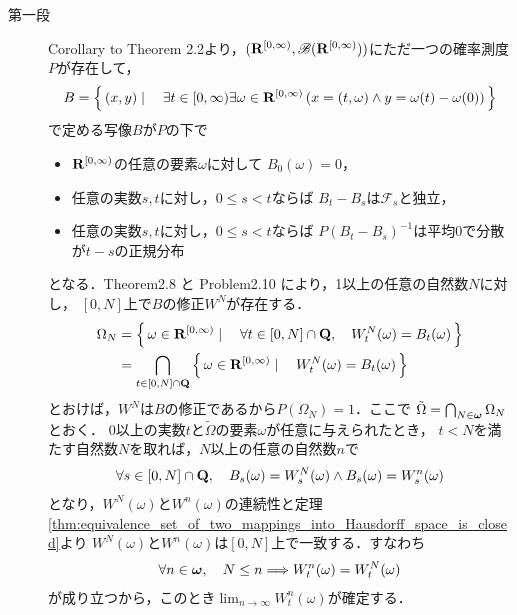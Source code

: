 	\begin{prf}\mbox{}
		\begin{description}
			\item[第一段]
				Corollary to Theorem 2.2より，$(\mathbf{R}^{[0,\infty)},\mathscr{B}(\mathbf{R}^{[0,\infty)}))$にただ一つの確率測度$P$が存在して，
				\begin{align}
					B = \left\{\, (x,y) \mid \quad \exists t \in [0,\infty) \exists \omega \in \mathbf{R}^{[0,\infty)}
					\left( x=(t,\omega) \wedge y=\omega(t)-\omega(0) \right)\, \right\}
				\end{align}
				で定める写像$B$が$P$の下で
				\begin{itemize}
					\item $\mathbf{R}^{[0,\infty)}$の任意の要素$\omega$に対して
						$B_0(\omega) = 0$，
					\item 任意の実数$s,t$に対し，$0 \leq s < t$ならば
						$B_t - B_s$は$\mathscr{F}_s$と独立，
					\item 任意の実数$s,t$に対し，$0 \leq s < t$ならば
						$P(B_t - B_s)^{-1}$は平均0で分散が$t-s$の正規分布
				\end{itemize}
				となる．Theorem2.8 と Problem2.10 により，1以上の任意の自然数$N$に対し，
				$[0,N]$上で$B$の修正$W^N$が存在する．
				\begin{align}
					\Omega_N &= \left\{\, \omega \in \mathbf{R}^{[0,\infty)} \mid \quad \forall t \in [0,N] \cap \mathbf{Q},
					\quad W_t^N(\omega) = B_t(\omega)\, \right\} \\
					&= \bigcap_{t \in [0,N] \cap \mathbf{Q}} \left\{\, \omega \in \mathbf{R}^{[0,\infty)} \mid \quad W_t^N(\omega) = B_t(\omega)\, \right\}
				\end{align}
				とおけば，$W^N$は$B$の修正であるから$P(\Omega_N)=1$．ここで
				$\tilde{\Omega} = \bigcap_{N \in {\boldsymbol \omega}}\Omega_N$とおく．
				0以上の実数$t$と$\tilde{\Omega}$の要素$\omega$が任意に与えられたとき，
				$t < N$を満たす自然数$N$を取れば，$N$以上の任意の自然数$n$で
				\begin{align}
					\forall s \in [0,N] \cap \mathbf{Q}, \quad
					B_s(\omega) = W^N_s(\omega) \wedge B_s(\omega) = W^n_s(\omega)
				\end{align}
				となり，$W^N(\omega)$と$W^n(\omega)$の連続性と定理
				\ref{thm:equivalence_set_of_two_mappings_into_Hausdorff_space_is_closed}より
				$W^N(\omega)$と$W^n(\omega)$は$[0,N]$上で一致する．すなわち
				\begin{align}
					\forall n \in {\boldsymbol \omega},\quad N \leq n \Longrightarrow W^n_t(\omega)
					= W^N_t(\omega)
				\end{align}
				が成り立つから，このとき$\lim_{n \to \infty} W^n_t(\omega)$が確定する．
				\begin{align}

\end{align}
\end{description}
\end{prf}
